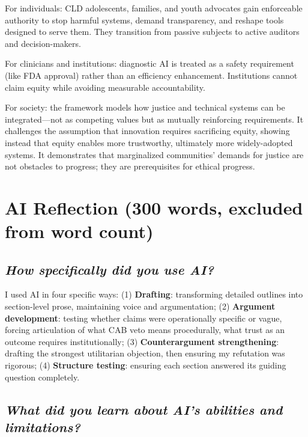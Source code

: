 \documentclass[12pt,a4paper]{article}
\begin{document}
For individuals: CLD adolescents, families, and youth advocates gain enforceable authority to stop harmful systems, demand transparency, and reshape tools designed to serve them. They transition from passive subjects to active auditors and decision-makers.

For clinicians and institutions: diagnostic AI is treated as a safety requirement (like FDA approval) rather than an efficiency enhancement. Institutions cannot claim equity while avoiding measurable accountability.

For society: the framework models how justice and technical systems can be integrated—not as competing values but as mutually reinforcing requirements. It challenges the assumption that innovation requires sacrificing equity, showing instead that equity enables more trustworthy, ultimately more widely-adopted systems. It demonstrates that marginalized communities' demands for justice are not obstacles to progress; they are prerequisites for ethical progress.

\section*{AI Reflection (300 words, excluded from word count)}

\subsection*{\textit{How specifically did you use AI?}}

I used AI in four specific ways: (1) \textbf{Drafting}: transforming detailed outlines into section-level prose, maintaining voice and argumentation; (2) \textbf{Argument development}: testing whether claims were operationally specific or vague, forcing articulation of what CAB veto means procedurally, what trust as an outcome requires institutionally; (3) \textbf{Counterargument strengthening}: drafting the strongest utilitarian objection, then ensuring my refutation was rigorous; (4) \textbf{Structure testing}: ensuring each section answered its guiding question completely.

\subsection*{\textit{What did you learn about AI's abilities and limitations?}}
\end{document}

